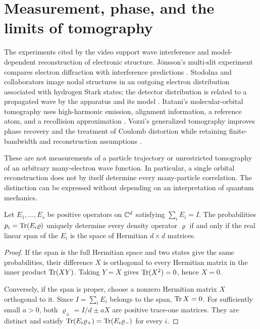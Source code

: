 \section{Measurement, phase, and the limits of tomography}

The experiments cited by the video support wave interference and
model-dependent reconstruction of electronic structure.  J\"onsson's
multi-slit experiment compares electron diffraction with interference
predictions \citep{microJonsson1974}.  Stodolna and collaborators image
nodal structures in an outgoing electron distribution associated with
hydrogen Stark states; the detector distribution is related to a
propagated wave by the apparatus and its model
\citep{microStodolna2013}.  Itatani's molecular-orbital tomography uses
high-harmonic emission, alignment information, a reference atom, and a
recollision approximation \citep{microItatani2004}.  Vozzi's generalized
tomography improves phase recovery and the treatment of Coulomb
distortion while retaining finite-bandwidth and reconstruction assumptions
\citep{microVozzi2011}.

These are not measurements of a particle trajectory or unrestricted
tomography of an arbitrary many-electron wave function.  In particular, a
single orbital reconstruction does not by itself determine every
many-particle correlation.  The distinction can be expressed without
depending on an interpretation of quantum mechanics.

\begin{proposition}
\label{prop:micro-tomography}
Let $E_1,\ldots,E_s$ be positive operators on $\mathbb{C}^d$ satisfying
$\sum_iE_i=I$.  The probabilities
$p_i=\operatorname{Tr}(E_i\varrho)$ uniquely determine every density operator
$\varrho$ if and only if the real linear span of the $E_i$ is the
space of Hermitian $d\times d$ matrices.
\end{proposition}
\begin{proof}
If the span is the full Hermitian space and two states give the same
probabilities, their difference $X$ is orthogonal to every Hermitian
matrix in the inner product $\operatorname{Tr}(XY)$.  Taking $Y=X$ gives
$\operatorname{Tr}(X^2)=0$, hence $X=0$.

Conversely, if the span is proper, choose a nonzero Hermitian matrix $X$
orthogonal to it.  Since $I=\sum_iE_i$ belongs to the span,
$\operatorname{Tr} X=0$.  For sufficiently small $a>0$, both
$\varrho_\pm=I/d\pm aX$ are positive trace-one matrices.  They are
distinct and satisfy $\operatorname{Tr}(E_i\varrho_+)=\operatorname{Tr}(E_i\varrho_-)$ for
every $i$.
\end{proof}

